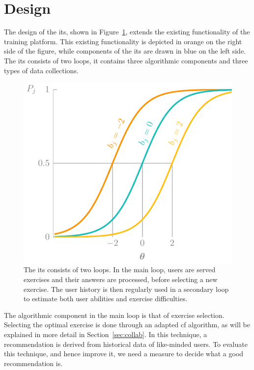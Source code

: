 \section{Design}
\label{sec:design}
The design of the \gls{its}, shown in Figure~\ref{fig:its-overview}, extends the existing functionality of the training platform.
This existing functionality is depicted in orange on the right side of the figure, while components of the \gls{its} are drawn in blue on the left side.
The \gls{its} consists of two loops, it contains three algorithmic components and three types of data collections.

\begin{figure}
    \centering
    \includegraphics[page=12]{03-education/figures/tikzfigures.pdf}
  \caption[Design of the ITS]{The \Gls{its} consists of two loops. In the main loop, users are served exercises and their answers are processed, before selecting a new exercise. The user history is then regularly used in a secondary loop to estimate both user abilities and exercise difficulties.}
  \label{fig:its-overview} 
\end{figure}

The algorithmic component in the main loop is that of exercise selection.
Selecting the optimal exercise is done through an adapted \gls{cf} algorithm, as will be explained in more detail in Section~\ref{sec:collab}.
In this technique, a recommendation is derived from historical data of like-minded users.
To evaluate this technique, and hence improve it, we need a measure to decide what a good recommendation is.

